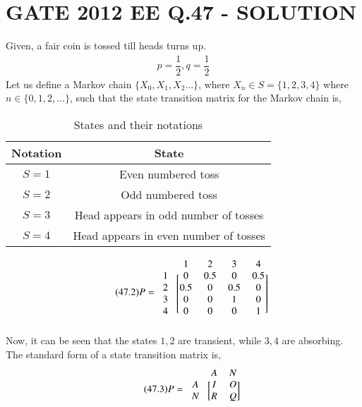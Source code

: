 \documentclass[journal,12pt,twocolumn]{IEEEtran}
\begin{document}
\section*{GATE 2012 EE Q.47 - SOLUTION}
Given, a fair coin is tossed till heads turns up.
\begin{align}
\tag{47.1}
\label{eq:0}
    p=\dfrac{1}{2},q=\dfrac{1}{2}
\end{align}
    Let us define a Markov chain $\{X_{0},X_{1},X_{2}\dots\}$, where $X_{n}\in S=\{1,2,3,4\}$ where $n\in \{0,1,2,\dots\}$, such that the state transition matrix for the Markov chain is,
    \begin{table}[h!]
\centering
\caption{States and their notations}
\label{table:1}
\begin{tabular}{|c|c|}
    \hline
    Notation & State \\
    \hline
    $S=1$ & Even numbered toss \\[1ex]
    \hline
    $S=2$ & Odd numbered toss\\[1ex]
    \hline
    $S=3$ & Head appears in odd number of tosses\\[1ex]
    \hline
    $S=4$ & Head appears in even number of tosses\\[1ex]
    \hline
\end{tabular}
\end{table}
\begin{align}
\tag{47.2}
\label{eq:p}
    P=\begin{blockarray}{ccccc}
&1 & 2 & 3 & 4 \\
\begin{block}{c[cccc]}
  1 & 0 & 0.5 & 0 & 0.5 \\
  2 & 0.5 & 0 & 0.5 & 0  \\
  3 & 0 & 0 & 1 & 0 \\
  4 & 0 & 0 & 0 & 1\\
\end{block}
\end{blockarray}
\end{align}
Now, it can be seen that the states $1,2$ are transient, while $3,4$ are absorbing. The standard form of a state transition matrix is,
\begin{align}
\tag{47.3}
\label{eq:std}
    P=\begin{blockarray}{ccc}
&A & N \\
\begin{block}{c[cc]}
  A & I & O  \\
  N & R & Q \\
\end{block}
\end{blockarray}
\end{align}
\end{document}
